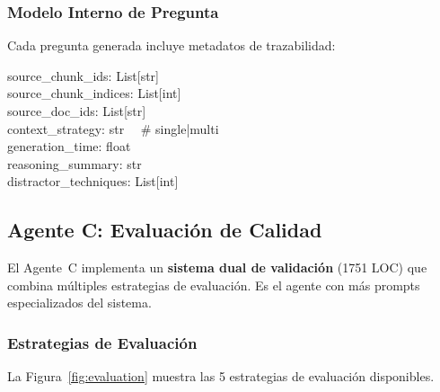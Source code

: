 \documentclass[10pt,twocolumn,letterpaper]{article}
\begin{document}
\subsubsection{Modelo Interno de Pregunta}

Cada pregunta generada incluye metadatos de trazabilidad:

\begin{tcolorbox}[colback=agentB!5, colframe=agentB, boxrule=0.5pt, arc=3pt,
  title={\small QuestionData}, fonttitle=\bfseries\small]
{\scriptsize\ttfamily
source\_chunk\_ids: List[str]\\
source\_chunk\_indices: List[int]\\
source\_doc\_ids: List[str]\\
context\_strategy: str ~~\# single|multi\\
generation\_time: float\\
reasoning\_summary: str\\
distractor\_techniques: List[int]
}
\end{tcolorbox}

\subsection{Agente C: Evaluaci\'on de Calidad}

El Agente~C implementa un \textbf{sistema dual de validaci\'on} (1751 LOC) que combina
m\'ultiples estrategias de evaluaci\'on. Es el agente con m\'as prompts especializados
del sistema.

\subsubsection{Estrategias de Evaluaci\'on}

La Figura~\ref{fig:evaluation} muestra las 5 estrategias de evaluaci\'on disponibles.
\end{document}
